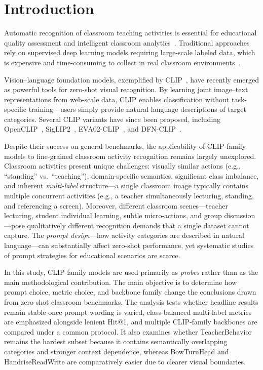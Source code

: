 \documentclass[symmetry,article,submit,pdftex,moreauthors]{Definitions/mdpi}
\begin{document}
\section{Introduction}
\label{sec:intro}

Automatic recognition of classroom teaching activities is essential for educational quality assessment and intelligent classroom analytics~\cite{brophy2000teaching,anderson2004classroom}.
Traditional approaches rely on supervised deep learning models requiring large-scale labeled data, which is expensive and time-consuming to collect in real classroom environments~\cite{yang2020classroom,ma2026agentic_ai}.

Vision--language foundation models, exemplified by CLIP~\cite{radford2021learning}, have recently emerged as powerful tools for zero-shot visual recognition.
By learning joint image--text representations from web-scale data, CLIP enables classification without task-specific training---users simply provide natural language descriptions of target categories.
Several CLIP variants have since been proposed, including OpenCLIP~\cite{cherti2023reproducible}, SigLIP2~\cite{tschannen2025siglip2}, EVA02-CLIP~\cite{sun2023eva02}, and DFN-CLIP~\cite{fang2023data}.

Despite their success on general benchmarks, the applicability of CLIP-family models to fine-grained classroom activity recognition remains largely unexplored.
Classroom activities present unique challenges: visually similar actions (e.g., ``standing'' vs.\ ``teaching''), domain-specific semantics, significant class imbalance, and inherent \emph{multi-label} structure---a single classroom image typically contains multiple concurrent activities (e.g., a teacher simultaneously lecturing, standing, and referencing a screen).
Moreover, different classroom scenes---teacher lecturing, student individual learning, subtle micro-actions, and group discussion---pose qualitatively different recognition demands that a single dataset cannot capture.
The \emph{prompt design}---how activity categories are described in natural language---can substantially affect zero-shot performance, yet systematic studies of prompt strategies for educational scenarios are scarce.

In this study, CLIP-family models are used primarily as \emph{probes} rather than as the main methodological contribution. The main objective is to determine how prompt choice, metric choice, and backbone family change the conclusions drawn from zero-shot classroom benchmarks. The analysis tests whether headline results remain stable once prompt wording is varied, class-balanced multi-label metrics are emphasized alongside lenient Hit@1, and multiple CLIP-family backbones are compared under a common protocol. It also examines whether TeacherBehavior remains the hardest subset because it contains semantically overlapping categories and stronger context dependence, whereas BowTurnHead and HandriseReadWrite are comparatively easier due to clearer visual boundaries.
\end{document}
